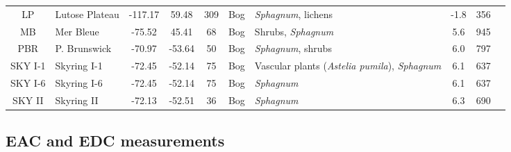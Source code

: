 \documentclass[alpha-refs, lineno]{wiley-article-rmd}
\begin{document}
\begin{landscape}
\begin{table}
{\begin{tabular}[t]{clcccc>{\raggedright\arraybackslash}p{4cm}cc>{\raggedright\arraybackslash}p{4cm}}
LP & Lutose Plateau & -117.17 & 59.48 & 309 & Bog & \emph{Sphagnum}, lichens & -1.8 & 356 & \textcite{Heffernan.2020}\\
\addlinespace
MB & Mer Bleue & -75.52 & 45.41 & 68 & Bog & Shrubs, \emph{Sphagnum} & 5.6 & 945 & \textcite{Elliott.2012}\\
PBR & P. Brunswick & -70.97 & -53.64 & 50 & Bog & \emph{Sphagnum}, shrubs & 6.0 & 797 & \textcite{Broder.2012}\\
SKY I-1 & Skyring I-1 & -72.45 & -52.14 & 75 & Bog & Vascular plants (\emph{Astelia pumila}), \emph{Sphagnum} & 6.1 & 637 & \textcite{Mathijssen.2019}\\
SKY I-6 & Skyring I-6 & -72.45 & -52.14 & 75 & Bog & \emph{Sphagnum} & 6.1 & 637 & \textcite{Mathijssen.2019}\\
SKY II & Skyring II & -72.13 & -52.51 & 36 & Bog & \emph{Sphagnum} & 6.3 & 690 & \textcite{Broder.2012}\\
\bottomrule
\end{tabular}}
\end{table}
\end{landscape}

\hypertarget{eac-and-edc-measurements}{%
\subsection{EAC and EDC measurements}\label{eac-and-edc-measurements}}
\end{document}
